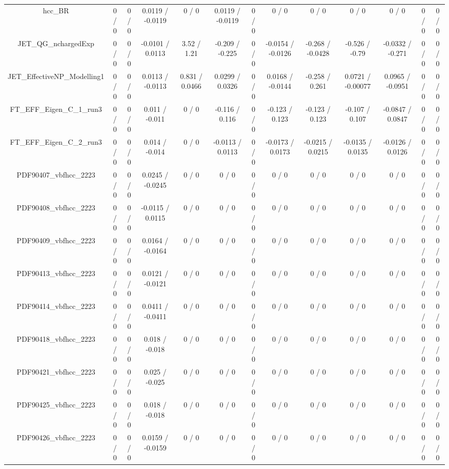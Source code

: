 \documentclass[10pt]{article}
\begin{document}
\begin{table}[htbp]
\begin{center}
\begin{tabular}{|c|c|c|c|c|c|c|c|c|c|c|c|c|}
  hcc_BR & 0 / 0 & 0 / 0 & 0.0119 / -0.0119 & 0 / 0 & 0.0119 / -0.0119 & 0 / 0 & 0 / 0 & 0 / 0 & 0 / 0 & 0 / 0 & 0 / 0 & 0 / 0 \\ 
  JET_QG_nchargedExp & 0 / 0 & 0 / 0 & -0.0101 / 0.0113 & 3.52 / 1.21 & -0.209 / -0.225 & 0 / 0 & -0.0154 / -0.0126 & -0.268 / -0.0428 & -0.526 / -0.79 & -0.0332 / -0.271 & 0 / 0 & 0 / 0 \\ 
  JET_EffectiveNP_Modelling1 & 0 / 0 & 0 / 0 & 0.0113 / -0.0113 & 0.831 / 0.0466 & 0.0299 / 0.0326 & 0 / 0 & 0.0168 / -0.0144 & -0.258 / 0.261 & 0.0721 / -0.00077 & 0.0965 / -0.0951 & 0 / 0 & 0 / 0 \\ 
  FT_EFF_Eigen_C_1_run3 & 0 / 0 & 0 / 0 & 0.011 / -0.011 & 0 / 0 & -0.116 / 0.116 & 0 / 0 & -0.123 / 0.123 & -0.123 / 0.123 & -0.107 / 0.107 & -0.0847 / 0.0847 & 0 / 0 & 0 / 0 \\ 
  FT_EFF_Eigen_C_2_run3 & 0 / 0 & 0 / 0 & 0.014 / -0.014 & 0 / 0 & -0.0113 / 0.0113 & 0 / 0 & -0.0173 / 0.0173 & -0.0215 / 0.0215 & -0.0135 / 0.0135 & -0.0126 / 0.0126 & 0 / 0 & 0 / 0 \\ 
  PDF90407_vbfhcc_2223 & 0 / 0 & 0 / 0 & 0.0245 / -0.0245 & 0 / 0 & 0 / 0 & 0 / 0 & 0 / 0 & 0 / 0 & 0 / 0 & 0 / 0 & 0 / 0 & 0 / 0 \\ 
  PDF90408_vbfhcc_2223 & 0 / 0 & 0 / 0 & -0.0115 / 0.0115 & 0 / 0 & 0 / 0 & 0 / 0 & 0 / 0 & 0 / 0 & 0 / 0 & 0 / 0 & 0 / 0 & 0 / 0 \\ 
  PDF90409_vbfhcc_2223 & 0 / 0 & 0 / 0 & 0.0164 / -0.0164 & 0 / 0 & 0 / 0 & 0 / 0 & 0 / 0 & 0 / 0 & 0 / 0 & 0 / 0 & 0 / 0 & 0 / 0 \\ 
  PDF90413_vbfhcc_2223 & 0 / 0 & 0 / 0 & 0.0121 / -0.0121 & 0 / 0 & 0 / 0 & 0 / 0 & 0 / 0 & 0 / 0 & 0 / 0 & 0 / 0 & 0 / 0 & 0 / 0 \\ 
  PDF90414_vbfhcc_2223 & 0 / 0 & 0 / 0 & 0.0411 / -0.0411 & 0 / 0 & 0 / 0 & 0 / 0 & 0 / 0 & 0 / 0 & 0 / 0 & 0 / 0 & 0 / 0 & 0 / 0 \\ 
  PDF90418_vbfhcc_2223 & 0 / 0 & 0 / 0 & 0.018 / -0.018 & 0 / 0 & 0 / 0 & 0 / 0 & 0 / 0 & 0 / 0 & 0 / 0 & 0 / 0 & 0 / 0 & 0 / 0 \\ 
  PDF90421_vbfhcc_2223 & 0 / 0 & 0 / 0 & 0.025 / -0.025 & 0 / 0 & 0 / 0 & 0 / 0 & 0 / 0 & 0 / 0 & 0 / 0 & 0 / 0 & 0 / 0 & 0 / 0 \\ 
  PDF90425_vbfhcc_2223 & 0 / 0 & 0 / 0 & 0.018 / -0.018 & 0 / 0 & 0 / 0 & 0 / 0 & 0 / 0 & 0 / 0 & 0 / 0 & 0 / 0 & 0 / 0 & 0 / 0 \\ 
  PDF90426_vbfhcc_2223 & 0 / 0 & 0 / 0 & 0.0159 / -0.0159 & 0 / 0 & 0 / 0 & 0 / 0 & 0 / 0 & 0 / 0 & 0 / 0 & 0 / 0 & 0 / 0 & 0 / 0 \\ 

\end{tabular}
\end{center}
\end{table}
\end{document}
